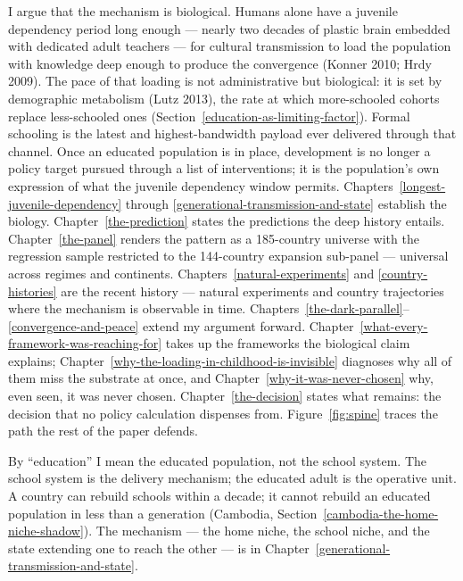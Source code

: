 \documentclass[12pt,letterpaper]{article}
\begin{document}
I argue that the mechanism is biological. Humans alone have
a juvenile dependency period long enough --- nearly two decades of
plastic brain embedded with dedicated adult teachers --- for cultural
transmission to load the population with knowledge deep enough to
produce the convergence (Konner 2010; Hrdy 2009). The pace of that
loading is not administrative but biological: it is set by demographic
metabolism (Lutz 2013), the rate at which more-schooled cohorts
replace less-schooled ones (Section~\ref{education-as-limiting-factor}).
Formal schooling is the latest and highest-bandwidth payload ever
delivered through that channel. Once an educated population is in
place, development is no longer a policy target pursued through a
list of interventions; it is the population's own expression of
what the juvenile dependency window permits. Chapters~\ref{longest-juvenile-dependency} through
\ref{generational-transmission-and-state} establish the biology.
Chapter~\ref{the-prediction} states the predictions the deep history
entails. Chapter~\ref{the-panel} renders the pattern as a 185-country
universe with the regression sample restricted to the 144-country
expansion sub-panel --- universal across regimes and continents.
Chapters~\ref{natural-experiments} and \ref{country-histories} are the
recent history --- natural experiments and country trajectories where
the mechanism is observable in time.
Chapters~\ref{the-dark-parallel}--\ref{convergence-and-peace} extend
my argument forward.
Chapter~\ref{what-every-framework-was-reaching-for} takes up the frameworks the
biological claim explains;
Chapter~\ref{why-the-loading-in-childhood-is-invisible} diagnoses why all of them
miss the substrate at once, and Chapter~\ref{why-it-was-never-chosen} why,
even seen, it was never chosen. Chapter~\ref{the-decision} states what
remains: the decision that no policy calculation dispenses from.
Figure~\ref{fig:spine} traces the path the rest of the paper defends.

By ``education'' I mean the educated population, not the
school system. The school system is the delivery mechanism; the
educated adult is the operative unit. A country can rebuild schools
within a decade; it cannot rebuild an educated population in less than
a generation (Cambodia,
Section~\ref{cambodia-the-home-niche-shadow}). The mechanism --- the home
niche, the school niche, and the state extending one to reach the
other --- is in
Chapter~\ref{generational-transmission-and-state}.
\end{document}
